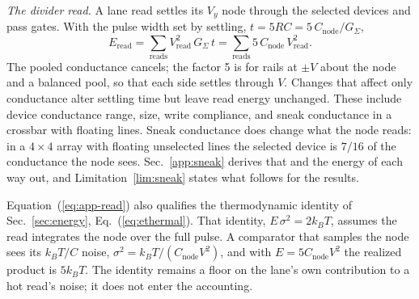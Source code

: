 \documentclass[reprint,amsmath,amssymb,aps,nofootinbib]{revtex4-2}
\newcommand{\kB}{k_{B}}
\begin{document}
\emph{The divider read.} A lane read settles its $V_y$ node through the
selected devices and pass gates. With the pulse width set by settling,
$t = 5RC = 5\,C_{\mathrm{node}} / G_\Sigma$,
\begin{equation}
E_{\mathrm{read}} = \sum_{\mathrm{reads}} V_{\mathrm{read}}^2\, G_\Sigma\, t
  = \sum_{\mathrm{reads}} 5\, C_{\mathrm{node}}\, V_{\mathrm{read}}^2 .
\label{eq:app-read}
\end{equation}
The pooled conductance cancels; the factor 5 is for rails at $\pm V$
about the node and a balanced pool, so that each side settles through
$V$. Changes that affect only conductance alter settling time but leave read
energy unchanged. These include device conductance range, size, write
compliance, and sneak conductance in a crossbar with floating lines.
Sneak conductance does change what the node reads: in a $4 \times 4$
array with floating unselected lines the selected device is $7/16$ of
the conductance the node sees. Sec.~\ref{app:sneak} derives that and
the energy of each way out, and Limitation~\ref{lim:sneak} states what
follows for the results.

Equation~(\ref{eq:app-read}) also qualifies the thermodynamic identity
of Sec.~\ref{sec:energy}, Eq.~(\ref{eq:ethermal}). That identity, $E\,\sigma^2 = 2\kB T$, assumes the read
integrates the node over the full pulse. A comparator that samples the
node sees its $\kB T / C$ noise, $\sigma^2 = \kB T / (C_{\mathrm{node}}
V^2)$, and with $E = 5 C_{\mathrm{node}} V^2$ the realized product is
$5 \kB T$. The identity remains a floor on the lane's own contribution
to a hot read's noise; it does not enter the accounting.
\end{document}
